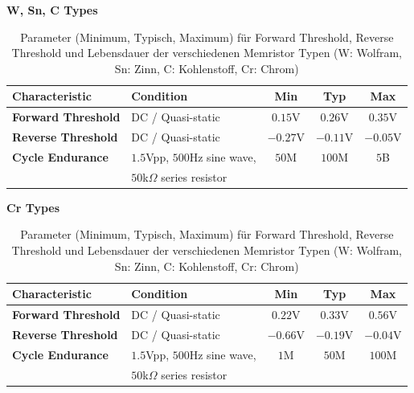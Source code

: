 \begin{table}
  \centering
  \textbf{W, Sn, C Types}
    \begin{tabular}{|l|l|c|c|c|}
      \hline \textbf{Characteristic}   & \textbf{Condition} & \textbf{Min} & \textbf{Typ} & \textbf{Max} \\\hline
      \textbf{Forward Threshold}& DC / Quasi-static  &      $0.15$V        &      $0.26$V        &    $0.35$V \\\hline
      \textbf{Reverse Threshold}& DC / Quasi-static  &       $-0.27$V       &      $-0.11$V        &  $-0.05$V \\\hline
      \textbf{Cycle Endurance}  & $1.5$Vpp, $500$Hz sine wave, &    $50$M          &       $100$M       &   $5$B \\
                                &  $50$k$\Omega$ series resistor &&&\\\hline
    \end{tabular}

    \textbf{Cr Types}
      \begin{tabular}{|l|l|c|c|c|}
        \hline \textbf{Characteristic}   & \textbf{Condition} & \textbf{Min} & \textbf{Typ} & \textbf{Max} \\\hline
        \textbf{Forward Threshold}& DC / Quasi-static  &      $0.22$V        &      $0.33$V        &    $0.56$V \\\hline
        \textbf{Reverse Threshold}& DC / Quasi-static  &       $-0.66$V       &      $-0.19$V        &  $-0.04$V \\\hline
        \textbf{Cycle Endurance}  & $1.5$Vpp, $500$Hz sine wave, &    $1$M          &       $50$M       &   $100$M \\
                                  &  $50$k$\Omega$ series resistor &&&\\\hline
      \end{tabular}
  \caption{Parameter (Minimum, Typisch, Maximum) für Forward Threshold, Reverse Threshold und Lebensdauer der verschiedenen Memristor Typen (W: Wolfram, Sn: Zinn, C: Kohlenstoff, Cr: Chrom)}
  \label{tab:Threshold_Lifetime_Params}
\end{table}

